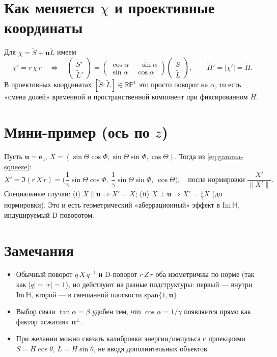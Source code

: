 \documentclass[11pt,a4paper]{article}
\newcommand{\ImH}{\mathrm{Im}\,\mathbb{H}}
\newcommand{\uu}{\mathbf{u}}        %
\newcommand{\Sand}[2]{#1\,#2\,#1}   %
\newcommand{\Snd}[2]{#1\,#2\,#1^{-1}} %
\begin{document}
\section{Как меняется \texorpdfstring{\(\chi\)}{chi} и проективные координаты}
Для \(\chi=\tilde S+\uu\tilde L\) имеем
\begin{equation}
  \chi'=\Sand{r}{\chi} \quad\Longleftrightarrow\quad
  \begin{pmatrix}\tilde S'\\ \tilde L'\end{pmatrix}
  =
  \begin{pmatrix}
    \cos\alpha & -\sin\alpha\\
    \sin\alpha & \ \cos\alpha
  \end{pmatrix}
  \begin{pmatrix}\tilde S\\ \tilde L\end{pmatrix},\qquad
  \tilde H'=|\chi'|=\tilde H.
\end{equation}
В проективных координатах \([\tilde S:\tilde L]\in\mathbb{RP}^1\) это просто поворот на \(\alpha\),
то есть «смена долей» временной и пространственной компонент при фиксированном \(\tilde H\).

\section{Мини-пример (ось по \texorpdfstring{\(z\)}{z})}
Пусть \(\uu=\mathbf e_z\), \(X=(\sin\Theta\cos\Phi,\sin\Theta\sin\Phi,\cos\Theta)\).
Тогда из \eqref{eq:gamma-squeeze}:
\begin{equation}
  X'=\Im(\Sand{r}{X})
  = \Big(\frac{1}{\gamma}\sin\Theta\cos\Phi,\ \frac{1}{\gamma}\sin\Theta\sin\Phi,\ \cos\Theta\Big),
  \quad\text{после нормировки } \frac{X'}{\|X'\|}.
\end{equation}
Специальные случаи: (i) \(X\parallel\uu\Rightarrow X'=X\);
(ii) \(X\perp\uu\Rightarrow X'=\frac{1}{\gamma}X\) (до нормировки).
Это и есть геометрический «аберрационный» эффект в \(\ImH\), индуцируемый D-поворотом.

\section{Замечания}
\begin{itemize}
  \item Обычный поворот \(\Snd{q}{X}\) и D-поворот \(\Sand{r}{Z}\) оба изометричны по норме
  (так как \(|q|=|r|=1\)), но действуют на разные подструктуры: первый --- внутри \(\ImH\),
  второй --- в смешанной плоскости \(\mathrm{span}\{1,\uu\}\).
  \item Выбор связи \(\tan\alpha=\beta\) удобен тем, что \(\cos\alpha=1/\gamma\) появляется
  прямо как фактор «сжатия» \(\uu^\perp\).
  \item При желании можно связать калибровки энергии/импульса с проекциями
  \(\tilde S=\tilde H\cos\theta\), \(\tilde L=\tilde H\sin\theta\), не вводя дополнительных объектов.
\end{itemize}
\end{document}

